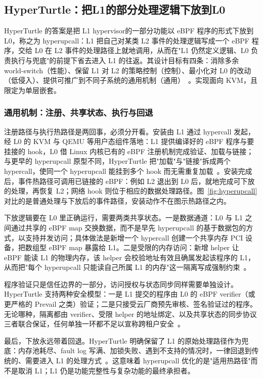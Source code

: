 \subsection{HyperTurtle：把L1的部分处理逻辑下放到L0}\label{sec:hyperturtle}

HyperTurtle 的答案是把 L1 hypervisor的一部分功能以 eBPF 程序的形式下放到 L0，称之为 hyperupcall：L1 把自己对某类 L2 事件的处理逻辑写成一个 eBPF 程序，交给 L0 在 L2 事件的处理路径上就地调用，从而在"L1 仍然定义逻辑、L0 负责执行与兜底"的前提下省去进入 L1 的往返。其设计目标有四条：消除多余 world-switch（性能）、保留 L1 对 L2 的策略控制（控制）、最小化对 L0 的改动（低侵入）、提供可推广到不同子系统的通用机制（通用）~\cite{source8}。实现面向 KVM，且限定为单层嵌套。

\subsubsection{通用机制：注册、共享状态、执行与回退}\label{sec:nested-ht-infra}

注册路径与执行热路径是两回事，必须分开看。安装由 L1 通过 hypercall 发起，经 L0 的 KVM 与 QEMU 等用户态组件落地：L1 提供编译好的 eBPF 程序与要挂接的 hook，L0 借 Linux 内核已有的 eBPF 注册机制完成验证、加载与链接；与更早的 hyperupcall 原型不同，HyperTurtle 把"加载"与"链接"拆成两个 hypercall，使同一个 hyperupcall 能挂到多个 hook 而无需重复加载~\cite{source8}。安装完成后，事件热路径可调用已链接的 eBPF：例如 L2 退出到 L0 后，就地完成可下放的处理，再恢复 L2；网络 hook 则位于相应的数据处理路径。图~\ref{fig:hyperupcall} 对比的是普通处理与下放后的事件路径，安装动作不在图示热路径之内。

下放逻辑要在 L0 里正确运行，需要两类共享状态。一是数据通道：L0 与 L1 之间通过共享的 eBPF map 交换数据，而不是早先 hyperupcall 的基于数据包的方式，以支持并发访问；具体做法是新增一个 hypercall 创建一个共享内存 PCI 设备，把数组型 eBPF map 暴露给 L1。二是受限的内存访问：新增 helper  让 eBPF 能读 L1 的物理内存，该 helper 会校验地址有效且确属发起该程序的 L1，从而把"每个 hyperupcall 只能读自己所属 L1 的内存"这一隔离写成强制约束~\cite{source8}。

程序验证只是信任边界的一部分，访问授权与状态同步同样需要单独设计。HyperTurtle 支持两种安全模型：一是 L1 提交的程序由 L0 的 eBPF verifier（或更严格的 Prevail 之类）验证；二是只接受云厂商预先审核、签名验证过的程序。无论哪种，隔离都由 verifier、受限 helper 的地址绑定、以及共享状态的同步协议三者联合保证，任何单独一环都不足以宣称跨租户安全~\cite{source8}。

最后，下放永远带着回退。HyperTurtle 明确保留了 L1 的原始处理路径作为兜底：内存池耗尽、fault log 写满、加锁失败、遇到不支持的情况时，一律回退到传统的、需要进入 L1 的处理方式~\cite{source8}。这意味着 hyperupcall 优化的是"适用热路径"而不是取消 L1；L1 仍是功能完整性与复杂功能的最终承担者。

